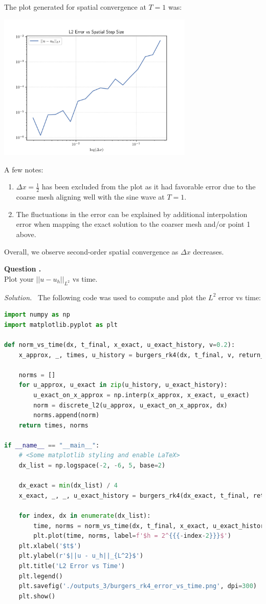 \documentclass[12pt]{article}
\newcounter{question}
\newcounter{subquest}
\newcommand{\subquestion}[1][true]{
    \stepcounter{subquest} 
    \ifthenelse{\equal{#1}{true} \and \value{subquest}>1}{\newpage}{}
    \vspace{1em}
    \textbf{\large Question \thequestion.\thesubquest}
    \vspace{.5em}\ \\}
\newcommand{\solution}
    {\par\vspace{0.5em}\noindent\emph{Solution.}\ }
    {\par\vspace{1em}}
\begin{document}
The plot generated for spatial convergence at $T=1$ was:
\begin{center}
\includegraphics[width=0.7\textwidth]{../outputs_3/burgers_rk4_error.png}
\end{center}

A few notes:
\begin{enumerate}
    \item $\Delta x=\frac{1}{2}$ has been excluded from the plot as it had favorable error due to the coarse mesh aligning well with the sine wave at $T=1$.
    \item The fluctuations in the error can be explained by additional interpolation error when mapping the exact solution to the coarser mesh and/or point 1 above.
\end{enumerate}

Overall, we observe second-order spatial convergence as $\Delta x$ decreases.

\subquestion
Plot your $||u-u_h||_{L^2}$ vs time.

\solution
The following code was used to compute and plot the $L^2$ error vs time:
\begin{lstlisting}[language=Python, caption=3.4 Python]
import numpy as np
import matplotlib.pyplot as plt

def norm_vs_time(dx, t_final, x_exact, u_exact_history, v=0.2):
    x_approx, _, times, u_history = burgers_rk4(dx, t_final, v, return_history=True)
    
    norms = []
    for u_approx, u_exact in zip(u_history, u_exact_history):
        u_exact_on_x_approx = np.interp(x_approx, x_exact, u_exact)
        norm = discrete_l2(u_approx, u_exact_on_x_approx, dx)
        norms.append(norm)
    return times, norms

if __name__ == "__main__":
    # <Some matplotlib styling and enable LaTeX>
    dx_list = np.logspace(-2, -6, 5, base=2)

    dx_exact = min(dx_list) / 4
    x_exact, _, _, u_exact_history = burgers_rk4(dx_exact, t_final, return_history=True)

    for index, dx in enumerate(dx_list):
        time, norms = norm_vs_time(dx, t_final, x_exact, u_exact_history)
        plt.plot(time, norms, label=f'$h = 2^{{{-index-2}}}$')
    plt.xlabel('$t$')
    plt.ylabel(r'$||u - u_h||_{L^2}$')
    plt.title('L2 Error vs Time')
    plt.legend()
    plt.savefig('./outputs_3/burgers_rk4_error_vs_time.png', dpi=300)
    plt.show()
\end{lstlisting}
\end{document}
